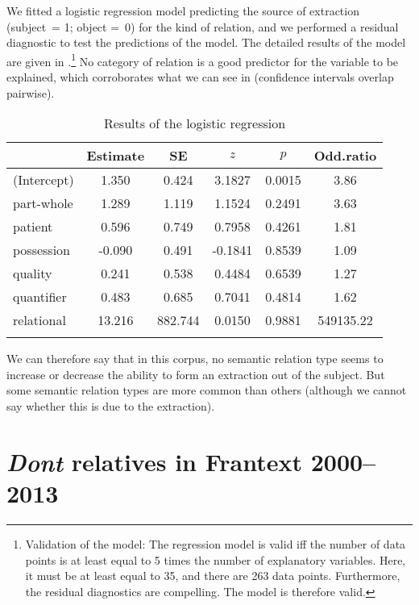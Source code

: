 We fitted a logistic regression model predicting the source of extraction (subject~= 1; object =~0) for the kind of relation, and we performed a residual diagnostic to test the predictions of the model. The detailed results of the model are given in .\footnote{Validation of the model: The regression model is valid iff the number of data points is at least equal to 5 times the number of explanatory variables. Here, it must be at least equal to 35, and there are 263 data points. Furthermore, the residual diagnostics are compelling. The model is therefore valid.} No category of relation is a good predictor for the variable to be explained, which corroborates what we can see in  (confidence intervals overlap pairwise). 

\begin{table}
\begin{tabular}{l S[table-format=-2.3] S[table-format=3.3] S[table-format=-1.4] S[table-format=1.4] S[table-format=6.2]}
  \lsptoprule
         & {Estimate} & {SE} & {$z$} & {$p$} & {Odd.ratio} \\ 
  \midrule
(Intercept)   & 1.350 & 0.424 & 3.1827 & 0.0015 & 3.86 \\ 
   part-whole & 1.289 & 1.119 & 1.1524 & 0.2491 & 3.63 \\ 
   patient    & 0.596 & 0.749 & 0.7958 & 0.4261 & 1.81 \\ 
   possession & -0.090 & 0.491 & -0.1841 & 0.8539 & 1.09 \\ 
   quality    & 0.241 & 0.538 & 0.4484 & 0.6539 & 1.27 \\ 
   quantifier & 0.483 & 0.685 & 0.7041 & 0.4814 & 1.62 \\ 
   relational & 13.216 & 882.744 & 0.0150 & 0.9881 & 549135.22 \\ 
   \lspbottomrule
\end{tabular}
\caption{Results of the logistic regression}
        \label{tab:FTB-relations}
\end{table}

We can therefore say that in this corpus, no semantic relation type seems to increase or decrease the ability to form an extraction out of the subject. But some semantic relation types are more common than others (although we cannot say whether this is due to the extraction).

\section{\emph{Dont} relatives in Frantext 2000--2013}


